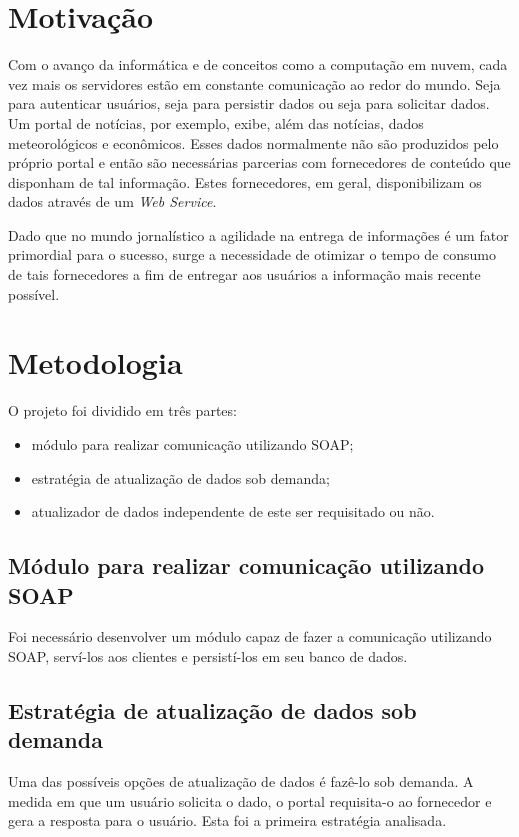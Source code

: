 \section{Motivação}

Com o avanço da informática e de conceitos como a computação em nuvem, cada vez mais os servidores estão em constante comunicação ao redor do mundo. Seja para autenticar usuários, seja para persistir dados ou seja para solicitar dados. Um portal de notícias, por exemplo, exibe, além das notícias, dados meteorológicos e econômicos. Esses dados normalmente não são produzidos pelo próprio portal e então são necessárias parcerias com fornecedores de conteúdo que disponham de tal informação. Estes fornecedores, em geral, disponibilizam os dados através de um \textit{Web Service}.

Dado que no mundo jornalístico a agilidade na entrega de informações é um fator primordial para o sucesso, surge a necessidade de otimizar o tempo de consumo de tais fornecedores a fim de entregar aos usuários a informação mais recente possível.

\section{Metodologia}

O projeto foi dividido em três partes: 

\begin{itemize}
\item módulo para realizar comunicação utilizando SOAP;
\item estratégia de atualização de dados sob demanda;
\item atualizador de dados independente de este ser requisitado ou não.
\end{itemize}


\subsection{Módulo para realizar comunicação utilizando SOAP}

Foi necessário desenvolver um módulo capaz de fazer a comunicação utilizando SOAP, serví-los aos clientes e persistí-los em seu banco de dados.

\subsection{Estratégia de atualização de dados sob demanda}

Uma das possíveis opções de atualização de dados é fazê-lo sob demanda. A medida em que um usuário solicita o dado, o portal requisita-o ao fornecedor e gera a resposta para o usuário. Esta foi a primeira estratégia analisada.

